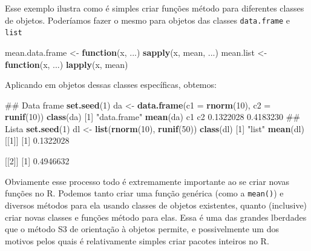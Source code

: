 \documentclass[10pt,a4paper]{book}
\newenvironment{Shaded}{\begin{snugshade}}{\end{snugshade}}
\newcommand{\KeywordTok}[1]{\textcolor[rgb]{0.13,0.29,0.53}{\textbf{#1}}}
\newcommand{\DataTypeTok}[1]{\textcolor[rgb]{0.13,0.29,0.53}{#1}}
\newcommand{\DecValTok}[1]{\textcolor[rgb]{0.00,0.00,0.81}{#1}}
\newcommand{\FloatTok}[1]{\textcolor[rgb]{0.00,0.00,0.81}{#1}}
\newcommand{\StringTok}[1]{\textcolor[rgb]{0.31,0.60,0.02}{#1}}
\newcommand{\ControlFlowTok}[1]{\textcolor[rgb]{0.13,0.29,0.53}{\textbf{#1}}}
\newcommand{\NormalTok}[1]{#1}
\begin{document}
Esse exemplo ilustra como é simples criar funções método para diferentes
classes de objetos. Poderíamos fazer o mesmo para objetos das classes
\texttt{data.frame} e \texttt{list}

\begin{Shaded}
\begin{Highlighting}[]
\NormalTok{mean.data.frame <-}\StringTok{ }\ControlFlowTok{function}\NormalTok{(x, ...) }\KeywordTok{sapply}\NormalTok{(x, mean, ...)}
\NormalTok{mean.list <-}\StringTok{ }\ControlFlowTok{function}\NormalTok{(x, ...) }\KeywordTok{lapply}\NormalTok{(x, mean)}
\end{Highlighting}
\end{Shaded}

Aplicando em objetos dessas classes específicas, obtemos:

\begin{Shaded}
\begin{Highlighting}[]
\NormalTok{## Data frame}
\KeywordTok{set.seed}\NormalTok{(}\DecValTok{1}\NormalTok{)}
\NormalTok{da <-}\StringTok{ }\KeywordTok{data.frame}\NormalTok{(}\DataTypeTok{c1 =} \KeywordTok{rnorm}\NormalTok{(}\DecValTok{10}\NormalTok{),}
                 \DataTypeTok{c2 =} \KeywordTok{runif}\NormalTok{(}\DecValTok{10}\NormalTok{))}
\KeywordTok{class}\NormalTok{(da)}
\NormalTok{[}\DecValTok{1}\NormalTok{] }\StringTok{"data.frame"}
\KeywordTok{mean}\NormalTok{(da)}
\NormalTok{       c1        c2 }
\FloatTok{0.1322028} \FloatTok{0.4183230} 
\NormalTok{## Lista}
\KeywordTok{set.seed}\NormalTok{(}\DecValTok{1}\NormalTok{)}
\NormalTok{dl <-}\StringTok{ }\KeywordTok{list}\NormalTok{(}\KeywordTok{rnorm}\NormalTok{(}\DecValTok{10}\NormalTok{), }\KeywordTok{runif}\NormalTok{(}\DecValTok{50}\NormalTok{))}
\KeywordTok{class}\NormalTok{(dl)}
\NormalTok{[}\DecValTok{1}\NormalTok{] }\StringTok{"list"}
\KeywordTok{mean}\NormalTok{(dl)}
\NormalTok{[[}\DecValTok{1}\NormalTok{]]}
\NormalTok{[}\DecValTok{1}\NormalTok{] }\FloatTok{0.1322028}

\NormalTok{[[}\DecValTok{2}\NormalTok{]]}
\NormalTok{[}\DecValTok{1}\NormalTok{] }\FloatTok{0.4946632}
\end{Highlighting}
\end{Shaded}

Obviamente esse processo todo é extremamente importante ao se criar
novas funções no R. Podemos tanto criar uma função genérica (como a
\texttt{mean()}) e diversos métodos para ela usando classes de objetos
existentes, quanto (inclusive) criar novas classes e funções método para
elas. Essa é uma das grandes lberdades que o método S3 de orientação à
objetos permite, e possivelmente um dos motivos pelos quais é
relativamente simples criar pacotes inteiros no R.
\end{document}
